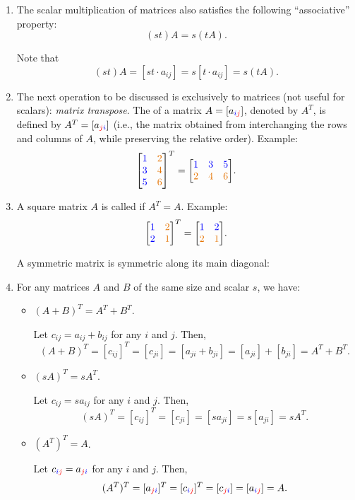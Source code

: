\begin{enumerate}
\item \label{it:matrix-scalar-mult-asso}
The scalar multiplication of matrices also satisfies the following
``associative'' property:
\[
(st)A=s(tA).
\]
\begin{pf}
Note that
\[
(st)A
=[st\cdot a_{ij}]
=s[t\cdot a_{ij}]
=s(tA).
\]
\end{pf}
\item The next operation to be discussed is exclusively to matrices (not useful
for scalars): \emph{matrix transpose}. The  of a matrix
\(A=[a_{{\color{blue}i}{\color{red}j}}]\), denoted by \(A^{T}\), is defined by
\(A^{T}=[a_{{\color{red}j}{\color{blue}i}}]\) (i.e., the matrix obtained from interchanging
the rows and columns of \(A\), while preserving the relative order). Example:
\[
\mqty[\blc{1}&\orc{2}\\\blc{3}&\orc{4}\\\blc{5}&\orc{6}]^{T}
=\mqty[
\blc{1}&\blc{3}&\blc{5}\\
\orc{2}&\orc{4}&\orc{6}
].
\]
\item A square matrix \(A\) is called  if \(A^{T}=A\). Example:
\[
\mqty[\blc{1}&\orc{2}\\\blc{2}&\orc{1}]^{T}
=\mqty[\blc{1}&\blc{2}\\
\orc{2}&\orc{1}].
\]
\begin{note}
A symmetric matrix is symmetric along its main diagonal:
\begin{center}
\end{center}
\end{note}
\item \label{it:matrix-trans-prop}
For any matrices \(A\) and \(B\) of the same size and scalar \(s\), we have:
\begin{itemize}
\item \((A+B)^{T}=A^{T}+B^{T}\).

\begin{pf}
Let \(c_{ij}=a_{ij}+b_{ij}\) for any \(i\) and \(j\). Then,
\[
(A+B)^{T}
=[c_{ij}]^{T}
=[c_{ji}]
=[a_{ji}+b_{ji}]
=[a_{ji}]+[b_{ji}]
=A^{T}+B^{T}.
\]
\end{pf}
\item \((sA)^{T}=sA^{T}\).

\begin{pf}
Let \(c_{ij}=sa_{ij}\) for any \(i\) and \(j\). Then,
\[
(sA)^{T}
=[c_{ij}]^{T}
=[c_{ji}]
=[sa_{ji}]
=s[a_{ji}]
=sA^{T}.
\]
\end{pf}
\item \((A^{T})^{T}=A\).

\begin{pf}
Let \(c_{{\color{blue}i}{\color{red}j}}=a_{{\color{red}j}{\color{blue}i}}\) for any \(i\) and \(j\). Then,
\[
(A^{T})^{T}
=[a_{{\color{red}j}{\color{blue}i}}]^{T}
=[c_{{\color{blue}i}{\color{red}j}}]^{T}
=[c_{{\color{red}j}{\color{blue}i}}]
=[a_{{\color{blue}i}{\color{red}j}}]
=A.
\]
\end{pf}
\end{itemize}
\end{enumerate}
